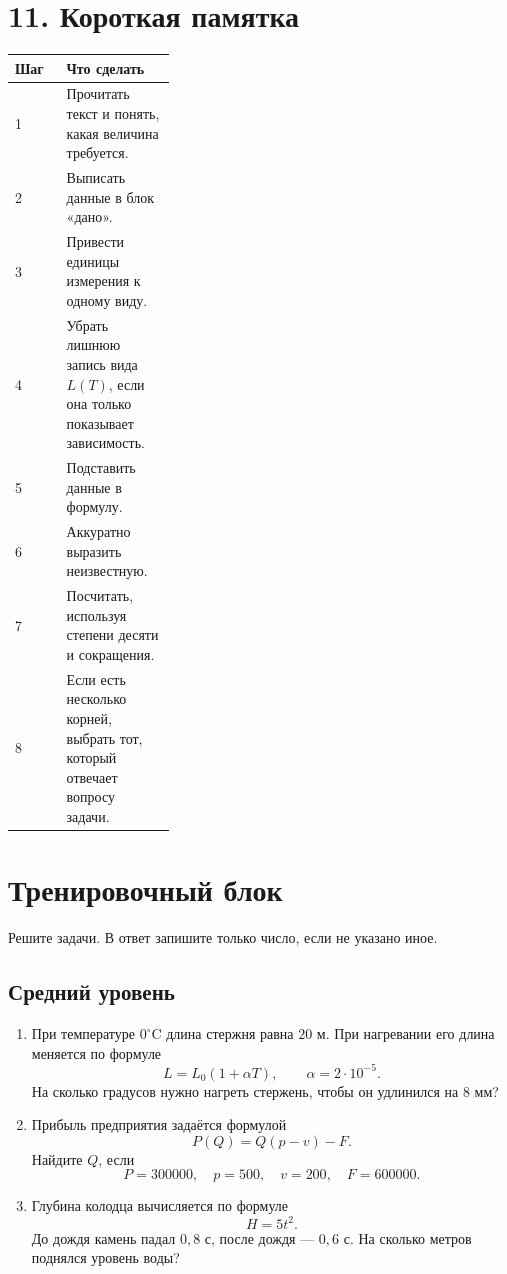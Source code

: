 \documentclass[a4paper,12pt]{article}
\begin{document}
\section*{11. Короткая памятка}

\begin{center}
\renewcommand{\arraystretch}{1.35}
\begin{tabularx}{\linewidth}{@{}p{0.32\linewidth}X@{}}
\toprule
\textbf{Шаг} & \textbf{Что сделать} \\
\midrule
1 & Прочитать текст и понять, какая величина требуется. \\
2 & Выписать данные в блок «дано». \\
3 & Привести единицы измерения к одному виду. \\
4 & Убрать лишнюю запись вида \(L(T)\), если она только показывает зависимость. \\
5 & Подставить данные в формулу. \\
6 & Аккуратно выразить неизвестную. \\
7 & Посчитать, используя степени десяти и сокращения. \\
8 & Если есть несколько корней, выбрать тот, который отвечает вопросу задачи. \\
\bottomrule
\end{tabularx}
\end{center}

\newpage

\section*{Тренировочный блок}

Решите задачи. В ответ запишите только число, если не указано иное.

\subsection*{Средний уровень}

\begin{enumerate}
  \item При температуре \(0^\circ\text{C}\) длина стержня равна \(20\) м. При нагревании его длина меняется по формуле
  \[
  L=L_0(1+\alpha T),
  \qquad
  \alpha=2\cdot10^{-5}.
  \]
  На сколько градусов нужно нагреть стержень, чтобы он удлинился на \(8\) мм?

  \item Прибыль предприятия задаётся формулой
  \[
  P(Q)=Q(p-v)-F.
  \]
  Найдите \(Q\), если
  \[
  P=300000,\quad p=500,\quad v=200,\quad F=600000.
  \]

  \item Глубина колодца вычисляется по формуле
  \[
  H=5t^2.
  \]
  До дождя камень падал \(0{,}8\) с, после дождя — \(0{,}6\) с. На сколько метров поднялся уровень воды?
\end{enumerate}
\end{document}
